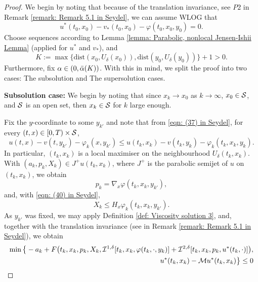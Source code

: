 \begin{proof}
    We begin by noting that because of the translation invariance, see  $P2$ in Remark \ref{remark: Remark 5.1 in Seydel}, we can assume WLOG that 
    \begin{equation*}
        u^*(t_0,x_0) - v_*(t_0,x_0) - \varphi(t_0,x_0,y_0) = 0.
    \end{equation*}
    Choose sequences according to Lemma \ref{lemma: Parabolic, nonlocal Jensen-Ishii Lemma} (applied for $u^*$ and $v_*$), and 
    \begin{equation*}
        K:= \max \big\{\text{dist}(x_0, U_\delta (x_0)), \text{dist}(y_0, U_\delta (y_0))\big\} + 1 > 0.
    \end{equation*}
    Furthermore, fix $\alpha \in (0,\Bar{\alpha}(K))$. With this in mind, we split the proof into two cases: The subsolution and The supersolution cases. 

    \textbf{Subsolution case:} We begin by noting that since $x_k \rightarrow x_0$ as $k \rightarrow \infty$, $x_0 \in \mathcal{S}$, and $\mathcal{S}$ is an open set, then $x_k \in \mathcal{S}$ for $k$ large enough. 
    
    Fix the $y$-coordinate to some $y_{k'}$ and note that from \eqref{eqn: (37) in Seydel}, for every $(t,x) \in [0,T) \times \mathcal{S}$, 
    \begin{equation*}
        u(t,x) - v(t,y_{k'}) - \varphi_k(x,y_{k'}) \leq u(t_k,x_k) - v(t_k,y_k) - \varphi_k(t_k,x_k,y_k). 
    \end{equation*}
    In particular, $(t_k,x_k)$ is a local maximiser on the neighbourhood $U_\delta(t_k,x_k)$. With $(a_k,p_k,X_k) \in J^+ u(t_k,x_k)$, where $J^+$ is the parabolic semijet of $u$ on $(t_k,x_k)$, we obtain
    \begin{equation*}
        p_k = \nabla_x \varphi (t_k,x_k,y_{k'}),
    \end{equation*}
    and, with \eqref{eqn: (40) in Seydel},
    \begin{equation*}
        X_k \leq H_x \varphi_k(t_k,x_k,y_{k'}). 
    \end{equation*}
    As $y_{k'}$ was fixed, we may apply Definition \ref{def: Viscosity solution 3}, and, together with the translation invariance (see  in Remark \ref{remark: Remark 5.1 in Seydel}), we obtain
    \begin{align}
        \min \big\{ - a_k + F\big(t_k,x_k,p_k,X_k,\mathcal{I}^{1,\delta}[t_k,x_k,\varphi(t_k,\cdot,y_k)] + \mathcal{I}^{2,\delta}[t_k,x_k,p_k,u^*(t_k,\cdot)]\big), \nonumber \\
        u^*(t_k,x_k) - \mathcal{M} u^*(t_k,x_k)\big\} \leq 0
        \label{eqn: (42) in Seydel}
    \end{align}


\end{proof}
